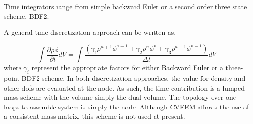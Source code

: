 Time integrators range from simple backward Euler or a 
second order three state scheme, BDF2.

A general time discretization approach can be written as,

\begin{equation}
  \int \frac{\partial \rho \phi }{\partial t} dV = \int \frac{ (\gamma_1 \rho^{n+1} \phi^{n+1} 
+ \gamma_2 \rho^{n} \phi^{n} + \gamma_3 \rho^{n-1} \phi^{n-1})} {\Delta t} dV 
\end{equation}
where $\gamma_i$ represent the appropriate factors for either Backward Euler or
a three-point BDF2 scheme. In both discretization approaches, the value for density and other dofs are
evaluated at the node. As such, the time contribution is a lumped mass scheme with the volume 
simply the dual volume. The topology over one loops to assemble system is simply the node. Although
CVFEM affords the use of a consistent mass matrix, this scheme is not used at present.
